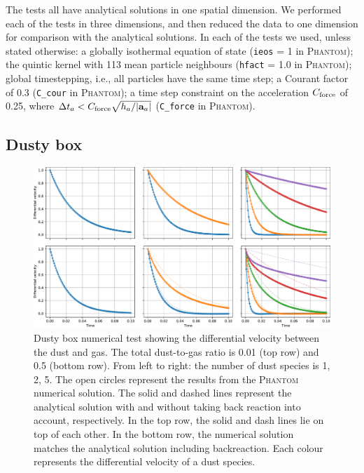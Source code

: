 \documentclass[fleqn,usenatbib]{mnras}
\let\vec\mathbf
\begin{document}
The tests all have analytical solutions in one spatial dimension. We performed
each of the tests in three dimensions, and then reduced the data to one
dimension for comparison with the analytical solutions. In each of the tests we
used, unless stated otherwise: a globally isothermal equation of state
(\texttt{ieos} = 1 in \textsc{Phantom}); the quintic kernel with 113 mean
particle neighbours (\texttt{hfact} = 1.0 in \textsc{Phantom}); global
timestepping, i.e., all particles have the same time step; a Courant factor of
0.3 (\texttt{C\_cour} in \textsc{Phantom}); a time step constraint on the
acceleration \( C_{\rm force} \) of 0.25, where \(\Delta t_a < C_{\rm force}
\sqrt{h_a / |\vec{a}_a|} \) (\texttt{C\_force} in \textsc{Phantom}).


\subsection{Dusty box}%
\label{subsec:box}

\begin{figure}
   \begin{center}
      \includegraphics[width=\textwidth]{figs/dustybox_differential_velocity_comparison.pdf}
      \caption{Dusty box numerical test showing the differential velocity
         between the dust and gas. The total dust-to-gas ratio is 0.01 (top row)
         and 0.5 (bottom row). From left to right: the number of dust species is
         1, 2, 5. The open circles represent the results from the
         \textsc{Phantom} numerical solution. The solid and dashed lines
         represent the analytical solution with and without taking back reaction
         into account, respectively. In the top row, the solid and dash lines
         lie on top of each other. In the bottom row, the numerical solution
         matches the analytical solution including backreaction. Each colour
         represents the differential velocity of a dust species.%
         \label{fig:dustybox}}
   \end{center}
\end{figure}
\end{document}
